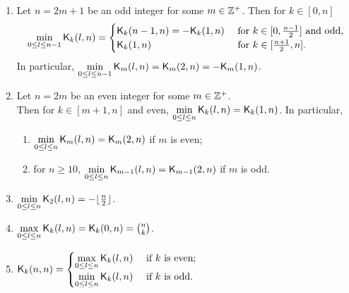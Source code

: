 \documentclass{llncs}
\begin{document}
\begin{theorem}\label{thm:minK}
\begin{enumerate}
\item\label{itm:odd} Let $n = 2m+1$ be an odd integer for some $m \in \mathbb{Z}^+$. Then for $k \in [0,n]$ 
$$\min\limits_{0 \leq l \leq n-1 }\mathsf{K}_{k}(l,n) = 
\begin{cases}
\mathsf{K}_{k}(n-1,n) = -\mathsf{K}_{k}(1,n) & \text{ for  } k \in [0,\frac{n-1}{2}] \text{ and odd}, \\
\mathsf{K}_{k}(1,n) & \text{ for }    k \in [\frac{n+1}{2}, n].
\end{cases}$$
In particular, $\min\limits_{0 \leq l \leq n-1 }\mathsf{K}_{m}(l,n) = \mathsf{K}_{m}(2,n) = -\mathsf{K}_{m}(1,n)$.

\item\label{itm:even} Let $n = 2m$ be an even integer for some $m \in \mathbb{Z}^+$.\\ Then for $k \in [m+1, n]$ and even,
$\min\limits_{0 \leq l \leq n }\mathsf{K}_{k}(l,n)= \mathsf{K}_{k}(1,n)$.
In particular,
\begin{enumerate}
\item $\min\limits_{0 \leq l \leq n }\mathsf{K}_{m}(l,n)= \mathsf{K}_{m}(2,n)$ if $m$ is even;
\item  for $n \geq 10$, $\min\limits_{0 \leq l \leq n }\mathsf{K}_{m - 1}(l,n) = \mathsf{K}_{m - 1}(2,n)$ if $m$ is odd.
\end{enumerate}
\item\label{itm:min2} $\min\limits_{0 \leq l \leq n} \mathsf{K}_{2}(l,n) = -\lfloor \frac{n}{2} \rfloor$.
\item\label{itm:maxk} $\max\limits_{0 \leq l \leq n} \mathsf{K}_{k}(l,n) = \mathsf{K}_{k}(0,n) = {n \choose k}$.
\item\label{itm:minmaxn} $\mathsf{K}_{k}(n,n) 
=  \begin{cases}
\max\limits_{0 \leq l \leq n} \mathsf{K}_{k}(l,n) & \text{ if $k$ is even};\\
\min\limits_{0 \leq l \leq n} \mathsf{K}_{k}(l,n) & \text{ if $k$ is odd}.
\end{cases}$
\end{enumerate}
\end{theorem}
\end{document}
